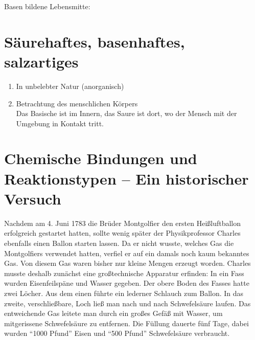 \begin{description}
   \item[Basen bildene Lebensmitte:]
\end{description}

\section{Säurehaftes, basenhaftes, salzartiges}
\begin{enumerate}
   \item In unbelebter Natur (anorganisch) \\
   \item Betrachtung des menschlichen Körpers \\
   Das Basische ist im Innern, das Saure ist dort, wo der Mensch mit der Umgebung in Kontakt tritt.
\end{enumerate}

\section{Chemische Bindungen und Reaktionstypen -- Ein historischer Versuch}
Nachdem am 4. Juni 1783 die Brüder Montgolfier
den ersten Heißluftballon erfolgreich gestartet hatten,
sollte wenig später der Physikprofessor Charles ebenfalls einen
Ballon starten lassen.
Da er nicht wusste, welches Gas die Montgolfiers verwendet
hatten, verfiel er auf ein damals noch kaum bekanntes Gas.
Von diesem Gas waren bisher nur kleine Mengen erzeugt worden.
Charles musste deshalb zunächst eine großtechnische Apparatur erfinden:
In ein Fass wurden Eisenfeilspäne und Wasser gegeben.
Der obere Boden des Fasses hatte zwei Löcher.
Aus dem einen führte ein lederner Schlauch zum Ballon.
In das zweite, verschließbare, Loch ließ man nach und nach Schwefelsäure laufen.
Das entweichende Gas leitete man durch ein großes Gefäß mit Wasser,
um mitgerissene Schwefelsäure zu entfernen.
Die Füllung dauerte fünf Tage, dabei wurden \enquote{1000 Pfund} Eisen und
\enquote{500 Pfund} Schwefelsäure verbraucht.


